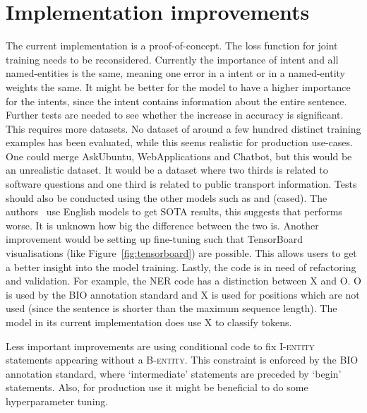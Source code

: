 \section{Implementation improvements}
\label{sec:implementation_improvements}
The current implementation is a proof-of-concept.
The loss function for joint training needs to be reconsidered.
Currently the importance of intent and all named-entities is the same, meaning one error in a intent or in a named-entity weights the same.
It might be better for the model to have a higher importance for the intents, since the intent contains information about the entire sentence.
Further tests are needed to see whether the increase in accuracy is significant.
This requires more datasets.
No dataset of around a few hundred distinct training examples has been evaluated, while this seems realistic for production use-cases.
One could merge AskUbuntu, WebApplications and Chatbot, but this would be an unrealistic dataset.
It would be a dataset where two thirds is related to software questions and one third is related to public transport information.
Tests should also be conducted using the other models such as  and  (cased).
The authors~\citep{devlin2018} use English models to get SOTA results, this suggests that  performs worse.
It is unknown how big the difference between the two is.
Another improvement would be setting up fine-tuning such that TensorBoard visualisations (like Figure~\ref{fig:tensorboard}) are possible.
This allows users to get a better insight into the model training.
Lastly, the code is in need of refactoring and validation.
For example, the NER code has a distinction between X and O.
O is used by the BIO annotation standard and X is used for positions which are not used (since the sentence is shorter than the maximum sequence length).
The model in its current implementation does use X to classify tokens.

Less important improvements are using conditional code to fix I-\textsc{entity} statements appearing without a B-\textsc{entity}.
This constraint is enforced by the BIO annotation standard, where `intermediate' statements are preceded by `begin' statements.
Also, for production use it might be beneficial to do some hyperparameter tuning.

